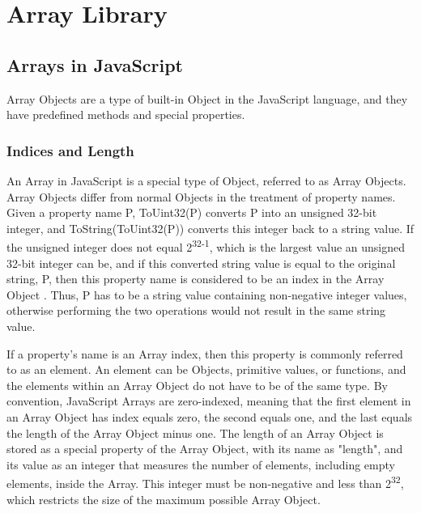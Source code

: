\documentclass[a4paper,11pt,twoside]{report}
\begin{document}
\chapter{Array Library}
\section{Arrays in JavaScript}
Array Objects are a type of built-in Object in the JavaScript language, and they have predefined methods and special properties. 

\subsection{Indices and Length}
An Array in JavaScript is a special type of Object, referred to as Array Objects. Array Objects differ from normal Objects in the treatment of property names. Given a property name P, ToUint32(P) converts P into an unsigned 32-bit integer, and ToString(ToUint32(P)) converts this integer back to a string value. If the unsigned integer does not equal 2\textsuperscript{32-1}, which is the largest value an unsigned 32-bit integer can be, and if this converted string value is equal to the original string, P, then this property name is considered to be an index in the Array Object \cite{EcmaScript}. Thus, P has to be a string value containing non-negative integer values, otherwise performing the two operations would not result in the same string value. 

If a property's name is an Array index, then this property is commonly referred to as an element. An element can be Objects, primitive values, or functions, and the elements within an Array Object do not have to be of the same type. By convention, JavaScript Arrays are zero-indexed, meaning that the first element in an Array Object has index equals zero, the second equals one, and the last equals the length of the Array Object minus one. The length of an Array Object is stored as a special property of the Array Object, with its name as "length", and its value as an integer that measures the number of elements, including empty elements, inside the Array. This integer must be non-negative and less than 2\textsuperscript{32}, which restricts the size of the maximum possible Array Object. 
\end{document}
